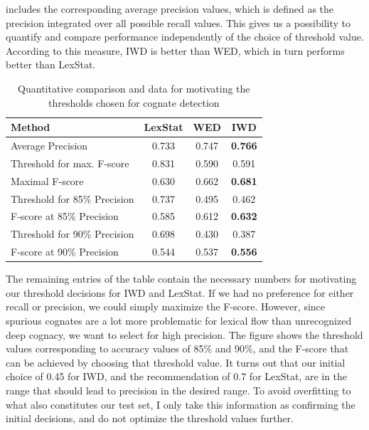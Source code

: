  includes the corresponding average precision values, which is defined as the precision integrated over all possible recall values. This gives us a possibility to quantify and compare performance independently of the choice of threshold value. According to this measure, IWD is better than WED, which in turn performs better than LexStat.

\begin{table}
 \centering
 \begin{tabular}{lccc}
  \hline \hline
  Method & LexStat & WED & IWD\\
  \hline
  Average Precision & 0.733 & 0.747 & \textbf{0.766}\\
  \hline
  Threshold for max. F-score & 0.831 & 0.590 & 0.591\\
  Maximal F-score & 0.630 & 0.662 & \textbf{0.681}\\
  \hline
  Threshold for 85\% Precision & 0.737 & 0.495 & 0.462\\
  F-score at 85\% Precision & 0.585 & 0.612 & \textbf{0.632}\\
  \hline
  Threshold for 90\% Precision & 0.698 & 0.430 & 0.387\\
  F-score at 90\% Precision & 0.544 & 0.537 & \textbf{0.556}\\
  \hline
 \end{tabular}
 \caption{Quantitative comparison and data for motivating the thresholds chosen for cognate detection}
 \label{average-precision-thresholds}
\end{table}

The remaining entries of the table contain the necessary numbers for motivating our threshold decisions for IWD and LexStat. If we had no preference for either recall or precision, we could simply maximize the F-score. However, since spurious cognates are a lot more problematic for lexical flow than unrecognized deep cognacy, we want to select for high precision. The figure shows the threshold values corresponding to accuracy values of 85\% and 90\%, and the F-score that can be achieved by choosing that threshold value. It turns out that our initial choice of 0.45 for IWD, and the recommendation of 0.7 for LexStat, are in the range that should lead to precision in the desired range. To avoid overfitting to what also constitutes our test set, I only take this information as confirming the initial decisions, and do not optimize the threshold values further.

